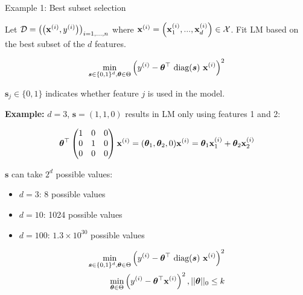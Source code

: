 \begin{vbframe}{Example 1: Best subset selection}

Let $\mathcal{D} = \left(\left(\mathbf{x}^{(i)}, y^{(i)}\right)\right)_{i = 1, ..., n}$ where $\mathbf{x}^{(i)} = \left(\mathbf{x}^{(i)}_1, ..., \mathbf{x}^{(i)}_d\right) \in \mathcal{X}$. Fit LM based on the best subset of the $d$ features. 

\vspace*{-0.5cm}
\begin{eqnarray*}
	\min_{\bm{s} \in \{0, 1\}^d, \bm{\theta} \in \Theta} \left(y^{(i)} - \bm{\theta}^\top ~\text{diag}(\bm{s})~\mathbf{x}^{(i)}\right)^2 \\
\end{eqnarray*}

\vspace*{-0.5cm}

$\bm{s}_j \in \{0, 1\}$ indicates whether feature $j$ is used in the model.

\lz 

\begin{footnotesize}
\textbf{Example:} $d = 3$, $\bm{s} = (1, 1, 0)$ results in LM only using features 1 and 2:

\begin{eqnarray*}
	\bm{\theta}^\top \begin{pmatrix} 1 & 0 & 0 \\
	0 & 1 & 0 \\
	0 & 0 & 0 
	\end{pmatrix} \mathbf{x}^{(i)} = (\bm{\theta}_1, \bm{\theta}_2, 0) \mathbf{x}^{(i)} = \bm{\theta}_1 \mathbf{x}^{(i)}_1 + \bm{\theta}_2 \mathbf{x}^{(i)}_2
\end{eqnarray*}

$\bm{s}$ can take $2^d$ possible values: 

\begin{itemize}
	\item $d = 3$: 8 possible values
	\item $d = 10$: 1024 possible values
	\item $d = 100$: $1.3 \times 10^{30}$ possible values	
\end{itemize}

\end{footnotesize}


\framebreak 

\vspace*{-1cm}

\begin{eqnarray*}
	\min_{\bm{s} \in \{0, 1\}^d, \bm{\theta} \in \Theta} \left(y^{(i)} - \bm{\theta}^\top ~\text{diag}(\bm{s})~\mathbf{x}^{(i)}\right)^2\\
	\min_{\bm{\theta} \in \Theta} \left(y^{(i)} - \bm{\theta}^\top\mathbf{x}^{(i)}\right)^2, ||\bm{\theta}||_{0} \leq k\\
\end{eqnarray*}


\end{vbframe}

